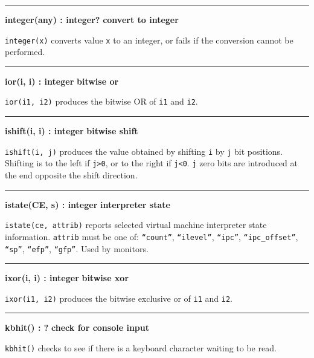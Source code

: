 \bigskip\hrule\vspace{0.1cm}
\noindent
{\bf integer(any) : integer? } \hfill {\bf convert to integer}

\noindent
{}\texttt{integer(x)} converts value \texttt{x}
to an integer, or fails if the conversion cannot be performed.

\bigskip\hrule\vspace{0.1cm}
\noindent
{\bf ior(i, i) : integer } \hfill {\bf bitwise or}

\noindent
{}\texttt{ior(i1, i2)} produces the bitwise OR of
\texttt{i1} and \texttt{i2}.

\bigskip\hrule\vspace{0.1cm}
\noindent
{\bf ishift(i, i) : integer } \hfill {\bf bitwise shift}

\noindent
{}\texttt{ishift(i, j)} produces the value obtained by
shifting \texttt{i} by \texttt{j} bit positions. Shifting is to the
left if \texttt{j{\textgreater}0}, or to the right if
\texttt{j{\textless}0}. \texttt{j} zero bits are introduced at the
end opposite the shift direction.

\bigskip\hrule\vspace{0.1cm}
\noindent
{\bf istate(CE, s) : integer } \hfill {\bf interpreter state}

\noindent
\texttt{istate(ce, attrib)} reports selected virtual machine interpreter
state information. \texttt{attrib} must be one of:
\texttt{{\textquotedblleft}count{\textquotedblright}},
\texttt{{\textquotedblleft}ilevel{\textquotedblright}},
\texttt{{\textquotedblleft}ipc{\textquotedblright}},
\texttt{{\textquotedblleft}ipc\_offset{\textquotedblright}},
\texttt{{\textquotedblleft}sp{\textquotedblright}},
\texttt{{\textquotedblleft}efp{\textquotedblright}},
\texttt{{\textquotedblleft}gfp{\textquotedblright}}. Used by monitors.

\bigskip\hrule\vspace{0.1cm}
\noindent
{\bf ixor(i, i) : integer } \hfill {\bf bitwise xor}

\noindent
\texttt{ixor(i1, i2)} produces the bitwise exclusive
or of \texttt{i1} and \texttt{i2}.

\bigskip\hrule\vspace{0.1cm}
\noindent
{\bf kbhit() : ? } \hfill {\bf check for console input}

\noindent
{}\texttt{kbhit()} checks to see if there is a
keyboard character waiting to be read.


